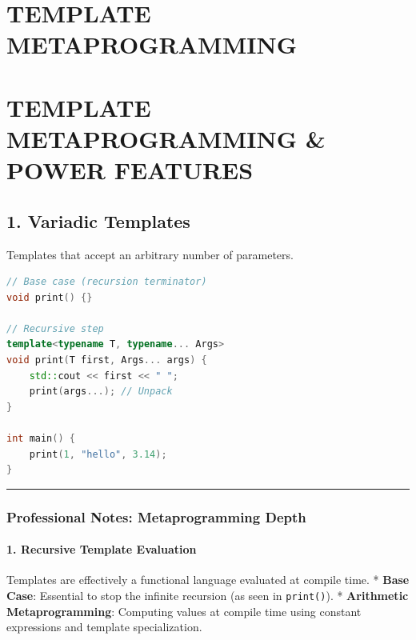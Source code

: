 \hypertarget{template-metaprogramming}{%
\chapter{TEMPLATE METAPROGRAMMING}\label{template-metaprogramming}}

\hypertarget{template-metaprogramming-power-features}{%
\chapter{TEMPLATE METAPROGRAMMING \& POWER
FEATURES}\label{template-metaprogramming-power-features}}

\hypertarget{variadic-templates}{%
\section{1. Variadic Templates}\label{variadic-templates}}

Templates that accept an arbitrary number of parameters.

\begin{lstlisting}[language={C++}]
// Base case (recursion terminator)
void print() {}

// Recursive step
template<typename T, typename... Args>
void print(T first, Args... args) {
    std::cout << first << " ";
    print(args...); // Unpack
}

int main() {
    print(1, "hello", 3.14);
}
\end{lstlisting}

\begin{center}\rule{0.5\linewidth}{0.5pt}\end{center}

\hypertarget{professional-notes-metaprogramming-depth}{%
\subsection{Professional Notes: Metaprogramming
Depth}\label{professional-notes-metaprogramming-depth}}

\hypertarget{recursive-template-evaluation}{%
\subsubsection{1. Recursive Template
Evaluation}\label{recursive-template-evaluation}}

Templates are effectively a functional language evaluated at compile
time. * \textbf{Base Case}: Essential to stop the infinite recursion (as
seen in \passthrough{\lstinline!print()!}). * \textbf{Arithmetic
Metaprogramming}: Computing values at compile time using constant
expressions and template specialization.

